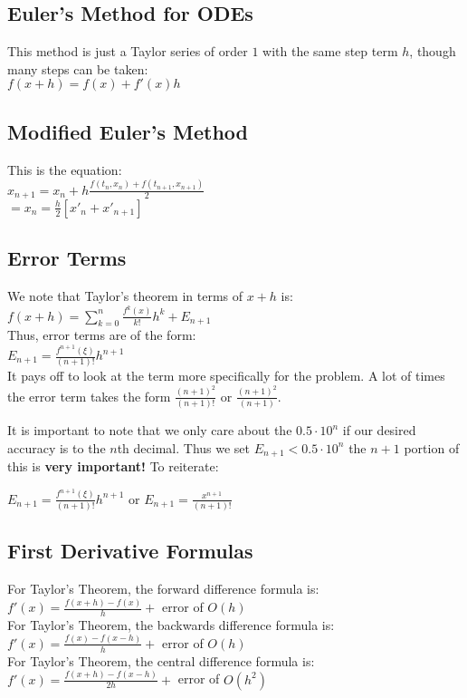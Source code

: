 \subsection*{Euler's Method for ODEs}
This method is just a Taylor series of order $1$ with the same step term $h$,
though many steps can be taken:\\
$ f(x + h) = f(x) + f'(x)h $\\

\subsection*{Modified Euler's Method}
This is the equation:\\
$x_{n+1} = x_n +h \frac{f(t_n,x_n) + f(t_{n+1},x_{n+1})}{2}$\\
$= x_n = \frac{h}{2}[ x'_{n} + x'_{n+1} ]$\\

\subsection*{Error Terms}
We note that Taylor's theorem in terms of $x+h$ is:\\
$ f(x+h) = \sum_{k=0}^{n} \frac{f^{k}(x)}{k!}h^k + E_{n+1} $\\
Thus, error terms are of the form:\\
$ E_{n+1} = \frac{f^{n+1}(\xi)}{(n+1)!}h^{n+1}$\\

It pays off to look at the term more specifically for the problem. A lot of times the
error term takes the form $\frac{(n+1)^2}{(n+1)!}$ or $\frac{(n+1)^2}{(n+1)}$.

It is important to note that we only care about the $0.5 \cdot 10^n$ if our desired
accuracy is to the $n$th decimal. Thus we set $E_{n+1} < 0.5 \cdot 10^n$ the $n+1$
portion of this is \textbf{very important!} To reiterate:

$ E_{n+1} = \frac{f^{n+1}(\xi)}{(n+1)!}h^{n+1} $ or $E_{n+1} = \frac{x^{n+1}}{(n+1)!}$\\

\subsection*{First Derivative Formulas}
For Taylor's Theorem, the forward difference formula is:\\
$f'(x) = \frac{f(x+h) - f(x)}{h} + $ error of $O(h)$\\
For Taylor's Theorem, the backwards difference formula is:\\
$f'(x) = \frac{f(x) - f(x - h)}{h} + $ error of $O(h)$\\
For Taylor's Theorem, the central difference formula is:\\
$f'(x) = \frac{f(x + h) - f(x - h)}{2h} + $ error of $O(h^2)$\\










